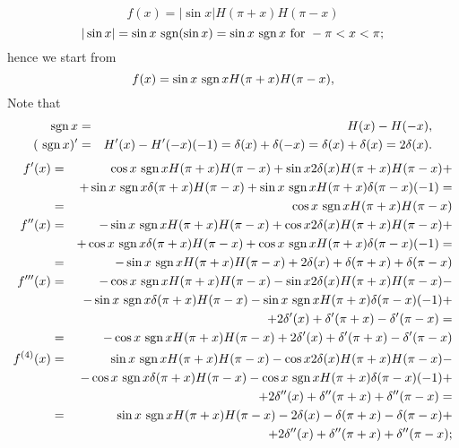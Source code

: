 {\begin{enumerate}
$$
   f(x)=|\sin x|H(\pi+x)H(\pi-x)
$$
$$
   |\sin x|=\sin x\mbox{ sgn}(\sin x)=\sin x\mbox{ sgn\,}x \text{ for }
     -\pi<x<\pi ;
$$
hence we start from
$$
  f(x)=\sin x\mbox{ sgn\,}xH(\pi+x)H(\pi-x),
$$
Note that
\begin{eqnarray*}
   \mbox{ sgn\,}x&=&H(x)-H(-x),\\
   (\mbox{ sgn\,}x)'&=&H'(x)-H'(-x)(-1)=\delta(x)+\delta(-x)=
                   \delta(x)+\delta(x)=2\delta(x).
\end{eqnarray*}
\begin{eqnarray*}
   f'(x)   &=   &\cos x\mbox{ sgn\,}xH(\pi+x)
           H(\pi-x)+\sin x2\delta(x)H(\pi+x)H(\pi-x)+\\
           &    &+\sin x\mbox{ sgn\,}x\delta(\pi+x)H(\pi-x) +
           \sin x\mbox{ sgn\,}x H(\pi+x)\delta(\pi-x)(-1)=\\
           &=   &\cos x\mbox{ sgn\,}xH(\pi+x)H(\pi-x)\\
   f''(x)   &=   & -\sin x\mbox{ sgn\,}xH(\pi+x)H(\pi-x)+
             \cos x2\delta(x)H(\pi+x)H(\pi-x)+\\
           &    &+\cos x\mbox{ sgn\,}x\delta(\pi + x)H(\pi - x)
              + \cos x\mbox{ sgn\,}x H(\pi + x)\delta(\pi - x)(-1)=\\
           &=   & -\sin x\mbox{ sgn\,}xH(\pi+x)H(\pi-x)+
             2\delta(x)+\delta(\pi+x)+\delta(\pi-x)\\
   f'''(x)   &=   & -\cos x\mbox{ sgn\,}xH(\pi+x)H(\pi-x)-
             \sin x2\delta(x)H(\pi+x)H(\pi-x)-\\
           &    &-\sin x\mbox{ sgn\,}x\delta(\pi+x)H(\pi-x) -
             \sin x \mbox{ sgn\,}x H(\pi+x)\delta(\pi-x)(-1)+\\
           &    &+2\delta'(x)+\delta'(\pi+x)-\delta'(\pi-x)=\\
           &=   & -\cos x\mbox{ sgn\,}xH(\pi+x)H(\pi-x)+
             2\delta'(x)+\delta'(\pi+x)-\delta'(\pi-x)\\
   f^{(4)}(x)   &=   & \sin x\mbox{ sgn\,}xH(\pi+x)H(\pi-x)-
             \cos x2\delta(x)H(\pi+x)H(\pi-x)-\\
           &    &-\cos x\mbox{ sgn\,}x\delta(\pi+x)H(\pi-x) -
             \cos x \mbox{ sgn\,}x H(\pi+x)\delta(\pi - x)(-1)+\\
           &    &+2\delta''(x)+\delta''(\pi+x)+\delta''(\pi-x)=\\
           &=   & \sin x\mbox{ sgn\,}xH(\pi+x)H(\pi-x)-
             2\delta(x)-\delta(\pi+x)-\delta(\pi-x)+\\
           &    &+2\delta''(x)+\delta''(\pi+x)+\delta''(\pi-x);

\end{eqnarray*}
\end{enumerate}}
